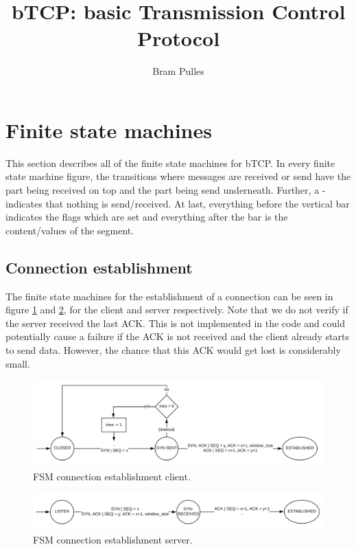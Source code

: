 \documentclass[a4paper]{article}
\author{Bram Pulles}
\title{\textbf{bTCP: basic Transmission Control Protocol}}
\begin{document}
\maketitle

\tableofcontents
\pagebreak

\section{Finite state machines}
This section describes all of the finite state machines for bTCP. In every finite state machine figure, the transitions where messages are received or send have the part being received on top and the part being send underneath. Further, a - indicates that nothing is send/received. At last, everything before the vertical bar indicates the flags which are set and everything after the bar is the content/values of the segment.

	\subsection{Connection establishment}
	The finite state machines for the establishment of a connection can be seen in figure \ref{fig: phase 1 client} and \ref{fig: phase 1 server}, for the client and server respectively. Note that we do not verify if the server received the last ACK. This is not implemented in the code and could potentially cause a failure if the ACK is not received and the client already starts to send data. However, the chance that this ACK would get lost is considerably small.
	\begin{figure}[h]
		\centering
		\includegraphics[width = \textwidth]{phase1_client.png}
		\caption{FSM connection establishment client.}
		\label{fig: phase 1 client}
	\end{figure}
	\begin{figure}[h]
		\centering
		\includegraphics[width = \textwidth]{phase1_server.png}
		\caption{FSM connection establishment server.}
		\label{fig: phase 1 server}
	\end{figure}
\end{document}
